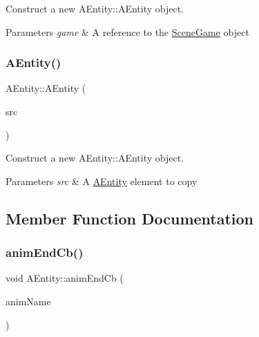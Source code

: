 Construct a new A\+Entity\+::\+A\+Entity object. 


\begin{DoxyParams}{Parameters}
{\em game} & A reference to the \hyperlink{class_scene_game}{Scene\+Game} object \\
\hline
\end{DoxyParams}
\mbox{\label{class_a_entity_ad1f884ccc47d377efe359e4fc2ce0592}} 
\subsubsection{\texorpdfstring{A\+Entity()}{AEntity()}\hspace{0.1cm}{\footnotesize\ttfamily [2/2]}}
{\footnotesize\ttfamily A\+Entity\+::\+A\+Entity (\begin{DoxyParamCaption}\item[{const \hyperlink{class_a_entity}{A\+Entity} \&}]{src }\end{DoxyParamCaption})}



Construct a new A\+Entity\+::\+A\+Entity object. 


\begin{DoxyParams}{Parameters}
{\em src} & A \hyperlink{class_a_entity}{A\+Entity} element to copy \\
\hline
\end{DoxyParams}


\subsection{Member Function Documentation}
\mbox{\label{class_a_entity_ac1fd0bdb4c01a4767660f03cd06cd2ac}} 
\subsubsection{\texorpdfstring{anim\+End\+Cb()}{animEndCb()}}
{\footnotesize\ttfamily void A\+Entity\+::anim\+End\+Cb (\begin{DoxyParamCaption}\item[{std\+::string}]{anim\+Name }\end{DoxyParamCaption})\hspace{0.3cm}{\ttfamily [virtual]}}



